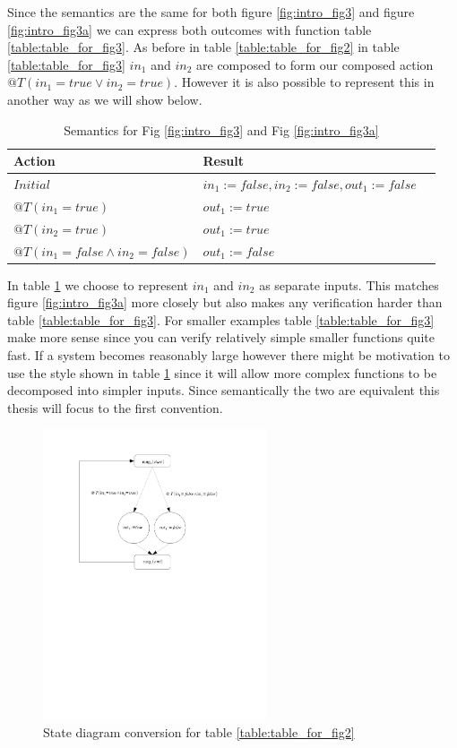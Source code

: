 Since the semantics are the same for both figure \ref{fig:intro_fig3} and figure \ref{fig:intro_fig3a} we can
express both outcomes with function table \ref{table:table_for_fig3}.
As before in table \ref{table:table_for_fig2} in table \ref{table:table_for_fig3} $in_1$ and $in_2$ are composed to form our composed action $@T(in_1 = true \vee in_2 = true)$. However it is also possible to represent this in another way as we will show below.

\begin{table}[h]
    \centering
       \begin{tabular}{|l|l|l|}
        \hline
        Action & Result \\
        \hline
        $Initial$ &$in_1 := false, in_2 := false, out_1 := false$\\
        \hline
        $@T(in_1 = true)$ & $out_1 := true$ \\
        \hline
        $@T(in_2 = true)$ & $out_1 := true$ \\
        \hline
        $@T(in_1 = false \wedge in_2 = false)$ & $out_1 := false$\\
        \hline
    \end{tabular}
    \caption{Semantics for Fig \ref{fig:intro_fig3} and Fig \ref{fig:intro_fig3a}}
    \label{table:table_for_fig3a}
\end{table}

In table \ref{table:table_for_fig3a} we choose to represent $in_1$ and $in_2$ as separate inputs. This matches figure
\ref{fig:intro_fig3a} more closely but also makes any verification harder than table \ref{table:table_for_fig3}. For
smaller examples table \ref{table:table_for_fig3} make more sense since you can verify relatively simple smaller functions
quite fast. If a system becomes reasonably large however there might be motivation to use the style shown in 
table \ref{table:table_for_fig3a} since it will allow more complex functions to be decomposed into simpler inputs.
Since semantically the two are equivalent this thesis will focus to the first convention.


\begin{figure}[h]
    \centering
    \includegraphics[trim= 0 140mm 40mm 10mm, clip, width=250px]{./images/intro_and_graph.pdf} %
    \caption{State diagram conversion for table \ref{table:table_for_fig2}}
    \label{fig:intro_and_graph}
\end{figure}

